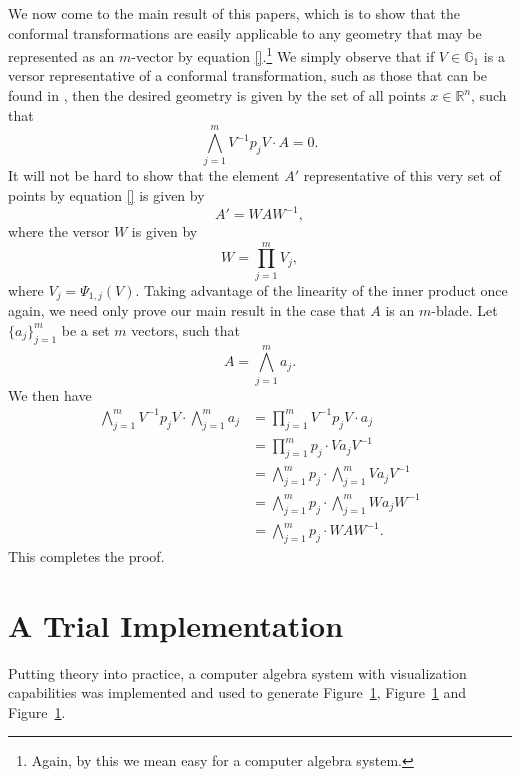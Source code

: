 \documentclass{ecgd-l}
\theoremstyle{definition}
\theoremstyle{remark}
\numberwithin{equation}{section}
\newcommand{\G}{\mathbb{G}}
\newcommand{\R}{\mathbb{R}}
\begin{document}
We now come to the main result of this papers, which is to show
that the conformal transformations are easily applicable to any geometry
that may be represented as an $m$-vector by equation \eqref{}.\footnote{Again,
by this we mean easy for a computer algebra system.}
We simply observe that if $V\in\G_1$ is a versor representative
of a conformal transformation, such as those that can be found in \cite{}, then the desired
geometry is given by the set of all points $x\in\R^n$, such that
\begin{equation*}
\bigwedge_{j=1}^m V^{-1}p_jV\cdot A=0.
\end{equation*}
It will not be hard to show that the element $A'$ representative
of this very set of points by equation \eqref{} is given by
\begin{equation*}
A' = WAW^{-1},
\end{equation*}
where the versor $W$ is given by
\begin{equation*}
W = \prod_{j=1}^m V_j,
\end{equation*}
where $V_j=\Psi_{1,j}(V)$.
Taking advantage of the linearity of the inner product once again,
we need only prove our main result in the case that $A$ is an $m$-blade.
Let $\{a_j\}_{j=1}^m$ be a set $m$ vectors, such that
\begin{equation*}
A = \bigwedge_{j=1}^m a_j.
\end{equation*}
We then have
\begin{align*}
\bigwedge_{j=1}^m V^{-1}p_jV\cdot\bigwedge_{j=1}^m a_j &= \prod_{j=1}^m V^{-1}p_jV\cdot a_j \\
 &= \prod_{j=1}^m p_j\cdot Va_jV^{-1} \\
&= \bigwedge_{j=1}^m p_j\cdot\bigwedge_{j=1}^m Va_jV^{-1} \\
&= \bigwedge_{j=1}^m p_j\cdot\bigwedge_{j=1}^m Wa_jW^{-1} \\
&= \bigwedge_{j=1}^m p_j\cdot WAW^{-1}.
\end{align*}
This completes the proof.

\section{A Trial Implementation}

Putting theory into practice, a computer algebra system with
visualization capabilities was implemented and used to generate Figure~\ref{},
Figure~\ref{} and Figure~\ref{}.


\end{document}
